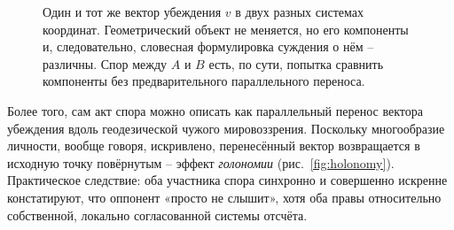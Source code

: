 \documentclass[11pt,a4paper]{article}
\begin{document}
\begin{figure}[htbp]
\centering
{}
\caption{Один и тот же вектор убеждения $v$ в двух разных системах координат. Геометрический объект не меняется, но его компоненты и, следовательно, словесная формулировка суждения о нём -- различны. Спор между $A$ и $B$ есть, по сути, попытка сравнить компоненты без предварительного параллельного переноса.}
\label{fig:covariance}
\end{figure}

Более того, сам акт спора можно описать как параллельный перенос вектора убеждения вдоль геодезической чужого мировоззрения. Поскольку многообразие личности, вообще говоря, искривлено, перенесённый вектор возвращается в исходную точку повёрнутым -- эффект \emph{голономии} (рис.~\ref{fig:holonomy}). Практическое следствие: оба участника спора синхронно и совершенно искренне констатируют, что оппонент «просто не слышит», хотя оба правы относительно собственной, локально согласованной системы отсчёта.
\end{document}
